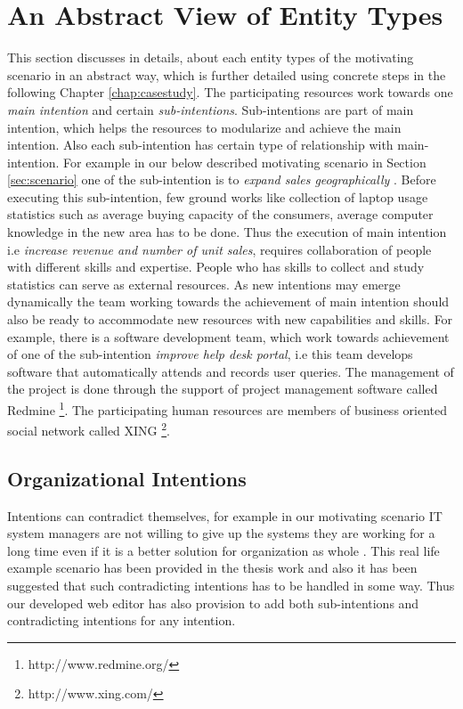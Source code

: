 \section{An Abstract View of Entity Types}
\label{sec:entities}
This section discusses in details, about each entity types of the motivating scenario in an abstract way, which is further detailed using concrete steps in the following Chapter \ref{chap:casestudy}. The participating resources work towards one \textit{main intention} and certain \textit{sub-intentions}. Sub-intentions are part of main intention, which helps the resources to modularize and achieve the main intention. Also each sub-intention has certain type of relationship with main-intention. For example in our below described motivating scenario in Section \ref{sec:scenario} one of the sub-intention is to \textit{expand sales geographically} . Before executing this sub-intention, few ground works like collection of laptop usage statistics such as average buying capacity of the consumers, average computer knowledge in the new area has to be done. Thus the execution of main intention i.e \textit{increase revenue and number of unit sales}, requires collaboration of people with different skills and expertise. People who has skills to collect and study statistics can serve as external resources. As new intentions may emerge dynamically the team working towards the achievement of main intention should also be ready to accommodate new resources with new capabilities and skills. For example, there is a software development team, which work towards achievement of one of the sub-intention \textit{improve help desk portal}, i.e this team develops software that automatically attends and records user queries.  The management of the project is done through the support of project management software called Redmine \footnote{http://www.redmine.org/}. The participating human resources are members of business oriented social network called XING \footnote{http://www.xing.com/}.
 

\subsection{Organizational Intentions} 
\label{sec:intentions}
Intentions can contradict themselves, for example in our motivating scenario IT system managers are not willing to give up the systems they are working for a long time even if it is a better solution for organization as whole . This real life example scenario has been provided in the thesis work \cite{Sierr2015} and also it has been suggested that such contradicting intentions has to be handled in some way. Thus our developed web editor has also provision to add both sub-intentions and contradicting intentions for any intention.  



